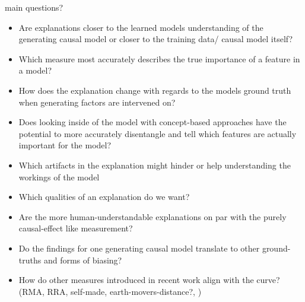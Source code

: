 {main questions?
\begin{itemize}
    \item Are explanations closer to the learned models understanding of the generating causal model or closer to the training data/ causal model itself?
    \item Which measure most accurately describes the true importance of a feature in a model?
    \item How does the explanation change with regards to the models ground truth when generating factors are intervened on?
    \item Does looking inside of the model with concept-based approaches have the potential to more accurately disentangle and tell which features are actually important for the model?
    \item Which artifacts in the explanation might hinder or help understanding the workings of the model
    \item Which qualities of an explanation do we want?
    \item Are the more human-understandable explanations on par with the purely causal-effect like measurement?
    \item Do the findings for one generating causal model translate to other ground-truths and forms of biasing?
    \item How do other measures introduced in recent work align with the curve? (RMA, RRA, self-made, earth-movers-distance?, )
\end{itemize}

}
